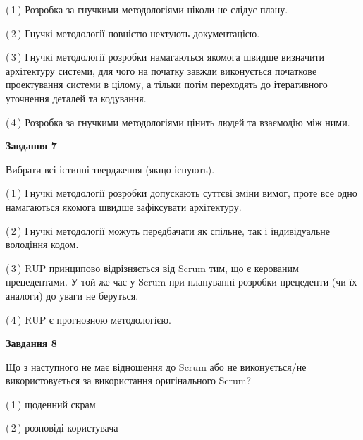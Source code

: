 \documentclass[10pt, ukrainian]{article}
\begin{document}
{\begin {large}
(\,1\,) Розробка за гнучкими методологіями ніколи не слідує плану. %



(\,2\,) Гнучкі методології повністю нехтують документацією. %



(\,3\,) Гнучкі методології розробки намагаються якомога швидше визначити архітектуру системи, для чого на початку завжди виконується початкове проектування системи в цілому, а тільки потім переходять до ітеративного уточнення деталей та кодування. %



(\,4\,) Розробка за гнучкими методологіями цінить людей та взаємодію між ними. %


{\begin {center}\textbf{Завдання 7}\end {center}}\par
Вибрати всі істинні твердження (якщо існують).\par
\vspace{2mm}



(\,1\,) Гнучкі методології розробки допускають суттєві зміни вимог, проте все одно намагаються якомога швидше зафіксувати архітектуру. %



(\,2\,) Гнучкі методології можуть передбачати як спільне, так і індивідуальне володіння кодом. %



(\,3\,) RUP принципово відрізняється від Scrum тим, що є керованим прецедентами. У той же час у Scrum при плануванні розробки прецеденти (чи їх аналоги) до уваги не беруться. %



(\,4\,) RUP є прогнозною методологією. %


{\begin {center}\textbf{Завдання 8}\end {center}}\par
Що з наступного не має відношення до Scrum або не виконується/не використовується за використання оригінального Scrum?\par
\vspace{2mm}



(\,1\,) щоденний скрам%



(\,2\,) розповіді користувача%




\end{large}}
\end{document}
